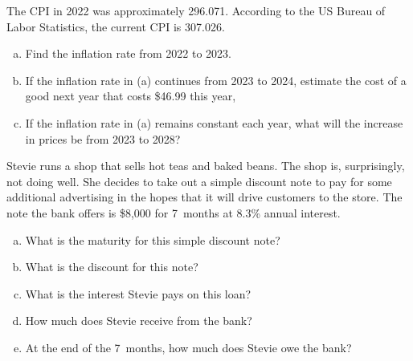 \documentclass[11pt,letterpaper]{article}
\begin{document}

 The CPI in 2022 was approximately 296.071. According to the US Bureau of Labor Statistics, the current CPI is 307.026.
	\begin{enumerate}[(a)]
	\item Find the inflation rate from 2022 to 2023. 
	\item If the inflation rate in (a) continues from 2023 to 2024, estimate the cost of a good next year that costs \$46.99 this year,
	\item If the inflation rate in (a) remains constant each year, what will the increase in prices be from 2023 to 2028? 
	\end{enumerate}



\newpage



 Stevie runs a shop that sells hot teas and baked beans. The shop is, surprisingly, not doing well. She decides to take out a simple discount note to pay for some additional advertising in the hopes that it will drive customers to the store. The note the bank offers is \$8,000 for 7~months at 8.3\% annual interest.
	\begin{enumerate}[(a)]
	\item What is the maturity for this simple discount note?
	\item What is the discount for this note?
	\item What is the interest Stevie pays on this loan?
	\item How much does Stevie receive from the bank?
	\item At the end of the 7~months, how much does Stevie owe the bank?
	\end{enumerate}
\end{document}
